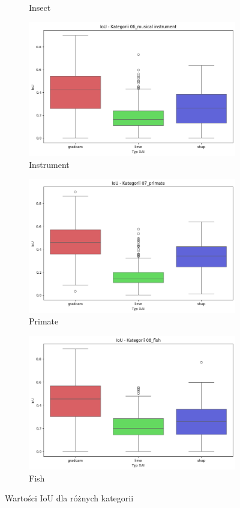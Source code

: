 \begin{figure}
\begin{subfigure}[b]{0.3\textwidth}
		\caption{Insect}  \label{rys:base_iou_insect}
	\end{subfigure}
	\begin{subfigure}[b]{0.3\textwidth}
		\centering\includegraphics[width=.9\textwidth]{img/base_iou_music}
		\caption{Instrument}  \label{rys:base_iou_music}
	\end{subfigure}
	\begin{subfigure}[b]{0.3\textwidth}
		\centering\includegraphics[width=.9\textwidth]{img/base_iou_primate}
		\caption{Primate}  \label{rys:base_iou_primate}
	\end{subfigure}
	\begin{subfigure}[b]{0.3\textwidth}
		\centering\includegraphics[width=.9\textwidth]{img/base_iou_fish}
		\caption{Fish}  \label{rys:base_iou_fish}
	\end{subfigure}
	\caption{Wartości IoU dla różnych kategorii}
\end{figure}

